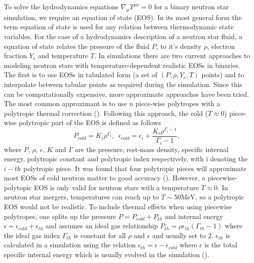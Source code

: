 To solve the hydrodynamics equations $\nabla_\mu T^{\mu\nu} = 0$ for a binary neutron star simulation, we require an equation of state (EOS). In its most general form the term equation of state is used for any relation between thermodynamic state variables. For the case of a hydrodynamics description of a neutron star fluid, a equation of state relates the pressure of the fluid $P$, to it's density $\rho$, electron fraction $Y_e$ and temperature $T$. In simulations there are two current approaches to modeling neutron stars with temperature-dependent realistic EOSs in binaries. The first is to use EOSs in tabulated form (a set of $(P,\rho,Y_e,T)$ points) and to interpolate between tabular points as required during the simulation. Since this can be computationally expensive, more approximate approaches have been tried. The most common approximant is to use $n$ piece-wise polytropes with a polytropic thermal correction (\citet*{deaton2013black,kyutoku2013black,bauswein2014revealing,kyutoku2015dynamical}). Following this approach, the cold ($T \approx 0$) piece-wise polytropic part of the EOS is defined as follows
%
\begin{equation}
\label{eq:7}
P_{cold} = K_i\rho^{\Gamma_i},\,\,\, \epsilon_{cold} = \epsilon_i + \frac{K_{i}\rho^{\Gamma_{i}-1}}{\Gamma_{i}-1},
\end{equation}
%
where $P$, $\rho$, $\epsilon$, $K$ and $\Gamma$ are the pressure, rest-mass density, specific internal energy, polytropic constant and polytropic index respectively, with i denoting the $i-th$ polytropic piece. It was found that four polytropic pieces will approximate most EOSs of cold neutron matter to good accuracy (\citet*{read2008neutron}). However, a piecewise-polytopic EOS is only valid for neutron stars with a temperature $T \approx 0$. In neutron star mergers, temperatures can reach up to $T \sim 50 \text{MeV}$, so a polytropic EOS would not be realistic. To include thermal effects when using piecewise polytropes, one splits up the pressure $P = P_{cold} + P_{th}$ and internal energy $\epsilon = \epsilon_{cold}+\epsilon_{th}$ and assumes an ideal gas relationship $P_{th} = \rho \epsilon_{th}(\Gamma_{th}-1)$ where the ideal gas index $\Gamma_{th}$ is constant for all $\rho$ and $\epsilon$ and usually set to 2. $\epsilon_{th}$ is calculated in a simulation using the relation $\epsilon_{th} = \epsilon - \epsilon_{cold}$ where $\epsilon$ is the total specific internal energy which is usually evolved in the simulation (\citet*{rezzolla2013relativistic,bauswein2010testing,takami2014constraining}). 


